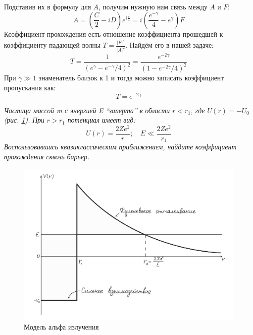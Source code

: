 Подставив их в формулу для $A$, получим нужную нам связь между $A$ и $F$:
\[
A = \left( \frac{C}{2} - iD \right)e^{i\frac{\pi}{4}} = i\left( \frac{e^{-\gamma}}{4} - e^{\gamma} \right)F
\]
Коэффициент прохождения есть отношение коэффициента прошедшей к коэффициенту падающей волны $T = \frac{|F|^2}{|A|^2}$. Найдём его в нашей задаче:
\[
T = \frac{1}{(e^{\gamma} - e^{-\gamma}/4)^2} = \frac{e^{-2\gamma}}{\left(1-e^{-2\gamma}/4\right)^2}
\]
При $\gamma \gg 1$ знаменатель близок к 1 и тогда можно записать коэффициент пропускания как:
\[
T = e^{-2\gamma}
\]

\begin{center}
\textit{Частица массой m с энергией E ``заперта'' в области $r<r_1$, где $U(r) = -U_0$ (рис. \ref{fig C.3}).  При $r > r_1$ потенциал имеет вид:}
\[
U(r) = \frac{2Ze^2}{r}; \quad E \ll \frac{2Ze^2}{r_1}
\]
\textit{Воспользовавшись квазиклассическим приближением, найдите коэффициент прохождения сквозь барьер.}
\end{center}

\begin{figure}[h!]
\centering
\includegraphics[scale=0.2]{appendix/images/alpha-decay.jpg}
\caption{Модель альфа излучения}
\label{fig C.3}
\end{figure}

